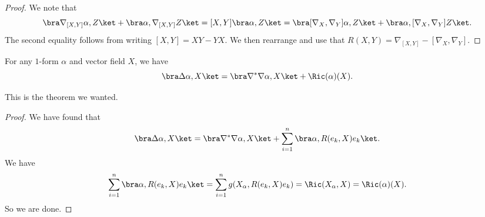 \documentclass[a4paper]{article}
\begin{document}
\begin{proof}
  We note that
  \[
    \bra \nabla_{[X, Y]} \alpha, Z\ket + \bra \alpha, \nabla_{[X, Y]}Z\ket = [X, Y] \bra \alpha, Z\ket = \bra [\nabla_X, \nabla_Y]\alpha, Z\ket + \bra \alpha, [\nabla_X, \nabla_Y] Z\ket.
  \]
  The second equality follows from writing $[X, Y] = XY - YX$. We then rearrange and use that $R(X, Y) = \nabla_{[X, Y]} - [\nabla_X, \nabla_Y]$.
\end{proof}

\begin{cor}
  For any $1$-form $\alpha$ and vector field $X$, we have
  \[
    \bra \Delta \alpha, X\ket = \bra \nabla^* \nabla \alpha, X\ket + \Ric(\alpha)(X).
  \]
\end{cor}
This is the theorem we wanted.

\begin{proof}
  We have found that
  \[
    \bra \Delta \alpha, X\ket = \bra \nabla^* \nabla \alpha, X\ket + \sum_{i = 1}^n \bra \alpha, R(e_k, X) e_k\ket.
  \]
  We have
  \[
    \sum_{i = 1}^n \bra \alpha, R(e_k, X)e_k\ket = \sum_{i = 1}^n g(X_\alpha, R(e_k, X) e_k) = \Ric(X_\alpha, X) = \Ric(\alpha)(X).
  \]
  So we are done.
\end{proof}
%
%
\end{document}
